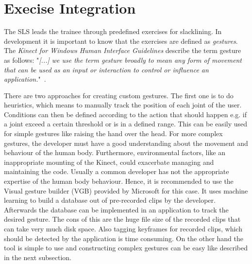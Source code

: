 \section{Execise Integration}\label{5_2_gestureConstruction}
The SLS leads the trainee through predefined exercises for slacklining. In development it is important to know that the exercises are defined as \textit{gestures}. The \textit{Kinect for Windows Human Interface Guidelines} describe the term gesture as follows: "\textit{[...] we use the term gesture broadly to mean any form of movement that can be used as an input or interaction to control or influence an application.}"~\cite{MicrosoftHIG2014-mh}.

There are two approaches for creating custom gestures.
The first one is to do heuristics, which means to manually track the position of each joint of the user. Conditions can then be defined according to the action that should happen e.g. if a joint exceed a certain threshold or is in a defined range.
This can be easily used for simple gestures like raising the hand over the head.
For more complex gestures, the developer must have a good understanding about the movement and behaviour of the human body.
Furthermore, environmental factors, like an inappropriate mounting of the Kinect, could exacerbate managing and maintaining the code.
Usually a common developer has not the appropriate expertise of the human body behaviour. Hence, it is recommended to use the Visual gesture builder (VGB) provided by Microsoft for this case.
It uses machine learning to build a database out of pre-recorded clips by the developer.
Afterwards the database can be implemented in an application to track the desired gesture.
The cons of this are the huge file size of the recorded clips that can take very much disk space.
Also tagging keyframes for recorded clips, which should be detected by the application is time consuming. 
On the other hand the tool is simple to use and constructing complex gestures can be easy like described in the next subsection.


